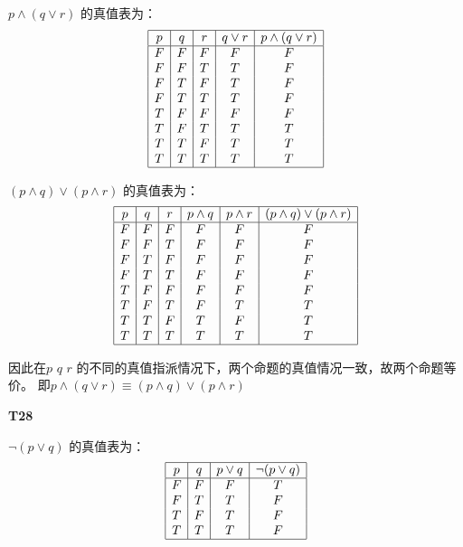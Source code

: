 \documentclass{article}
\begin{document}
$p \land (q \lor r)$ 的真值表为：
\[
\begin{array}{|c|c|c|c|c|}
    \hline
    p & q & r & q \lor r & p \land (q \lor r)\\
    \hline
    F & F & F & F & F\\
    F & F & T & T & F\\
    F & T & F & T & F\\
    F & T & T & T & F\\
    T & F & F & F & F\\
    T & F & T & T & T\\
    T & T & F & T & T\\
    T & T & T & T & T\\
    \hline
\end{array}
\]

$(p \land q) \lor (p \land r)$ 的真值表为：
\[
\begin{array}{|c|c|c|c|c|c|}
    \hline
    p & q & r & p \land q & p \land r & (p \land q) \lor (p \land r)\\
    \hline
    F & F & F & F & F & F\\
    F & F & T & F & F & F\\
    F & T & F & F & F & F\\
    F & T & T & F & F & F\\
    T & F & F & F & F & F\\
    T & F & T & F & T & T\\
    T & T & F & T & F & T\\
    T & T & T & T & T & T\\
    \hline    
\end{array}
\]

因此在$\textit{p q r}$ 的不同的真值指派情况下，两个命题的真值情况一致，故两个命题等价。
即$p \land (q \lor r) \equiv (p \land q) \lor (p \land r)$

\vspace{10pt}

\textbf{T28}

$\lnot (p \lor q)$ 的真值表为：
\[
\begin{array}{|c|c|c|c|}
    \hline
    p & q & p \lor q & \lnot (p \lor q)\\
    \hline
    F & F & F & T\\
    F & T & T & F\\
    T & F & T & F\\
    T & T & T & F\\
    \hline
\end{array}
\]
\end{document}
